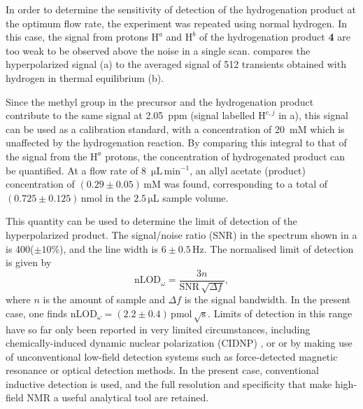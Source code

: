 In order to determine the sensitivity of detection of the hydrogenation product
at the optimum flow rate, the experiment was repeated using normal hydrogen.
In this case, the signal from  protons $\mathrm{H}^a$ and $\mathrm{H}^b$
of the hydrogenation product \textbf{4}
are too weak to be observed above the noise in a single scan.
compares the hyperpolarized signal (a) to the averaged signal of 512 transients
obtained with hydrogen in thermal equilibrium (b).

Since the methyl group in the
precursor and the hydrogenation product contribute to the same signal at 2.05~ppm
(signal labelled $\mathrm{H}^{e,j}$ in a),
this signal can be used as a calibration standard, with a concentration of 20~mM
which is unaffected by the hydrogenation reaction. By comparing this integral to that
of the signal from the $\mathrm{H}^a$ protons, the concentration
of hydrogenated product can be
quantified. At a flow rate of 8~$\mathrm{\mu L\,\text{min}^{-1}}$, an allyl acetate
(product) concentration of $(0.29\pm 0.05)\,\mathrm{mM}$ was found, corresponding to a total
of $(0.725\pm0.125)\,\text{nmol}$ in the $2.5\,\mathrm{\mu L}$ sample volume.


This quantity can be used to determine the limit of detection of the
hyperpolarized product. The signal/noise ratio (SNR) in the spectrum shown in
a is 400($\pm 10\%$), and the line width is $6\pm
0.5\,\text{Hz}$. The normalised limit of detection is given by \[
\text{nLOD}_\omega = \frac{3 n}{\text{SNR}\,\sqrt{\Delta f}}, \] where $n$ is
the amount of sample and $\Delta f$ is the signal bandwidth. In the present
case, one finds $\text{nLOD}_\omega = (2.2\pm
0.4)\,\text{pmol}\,\sqrt{\text{s}}$. Limits of detection in this range have so
far only been reported in very limited circumstances, including
chemically-induced dynamic nuclear polarization (CIDNP)
\cite{mompean2018pushing}, or or by making use of unconventional low-field
detection systems
such as force-detected magnetic resonance or optical detection methods\cite{Rugar:1992dm,Rugar:2004bc,Mamin:2007ff,Poggio:2010jf,
Maze:2008cs,Staudacher:2013kn,Rugar:2015by,McDermott:2002hp,
Budker:2007hz,Xu:2006kg,Blanchard:2013gs}. In the
present case, conventional inductive detection is used, and the full
resolution and specificity that make high-field NMR a useful
analytical tool are retained.

